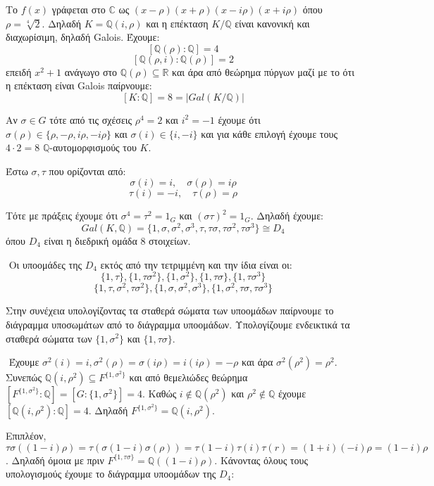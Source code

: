 \documentclass[oneside,a4paper]{article}
\newcommand {\tl}{\textlatin}
\newcommand{\Q}{\mathbb{Q}}
\begin{document}
Το $f(x)$ γράφεται στο $\mathbb C$ ως $(x-\rho )(x+\rho )(x-i\rho )(x+i\rho )$ όπου $\rho = \sqrt[4]2$. Δηλαδή $K = \Q (i,\rho )$ και η επέκταση $K/\Q$ είναι κανονική και διαχωρίσιμη, δηλαδή \tl{Galois}. Έχουμε:
$$[\Q (\rho ): \Q] = 4$$
$$[\Q (\rho, i) : \Q(\rho )]=2 $$
επειδή $x^2 +1$ ανάγωγο στο $\Q (\rho) \subseteq \mathbb R$ και άρα από θεώρημα πύργων μαζί με το ότι η επέκταση είναι \tl{Galois} παίρνουμε:
$$[K:\Q ]  = 8 = |Gal(K/\Q )|$$

Αν $\sigma \in G$ τότε από τις σχέσεις $\rho^4 = 2$ και $i^2 = -1$ έχουμε ότι $\sigma (\rho) \in \{ \rho, -\rho , i\rho , -i\rho \}$ και $\sigma (i) \in \{i,-i\}$ και για κάθε επιλογή έχουμε τους $4\cdot 2 = 8$ $\Q$-αυτομορφισμούς του $K$.

Έστω $\sigma , \tau$ που ορίζονται από:
$$\sigma (i) = i, \quad \sigma (\rho ) = i\rho $$
$$\tau (i) = -i, \quad \tau(\rho ) = \rho $$

Τότε με πράξεις έχουμε ότι $\sigma ^4 = \tau^2 = 1_G$ και $(\sigma \tau )^2 = 1_G$. Δηλαδή έχουμε: 
$$ Gal(K, \Q) = \{1, \sigma , \sigma^2 , \sigma ^3 , \tau , \tau\sigma , \tau\sigma^2 , \tau\sigma^3 \} \cong D_4$$
όπου $D_4$ είναι η διεδρική ομάδα 8 στοιχείων. 

$ $\newline
Οι υποομάδες της $D_4$ εκτός από την τετριμμένη και την ίδια είναι οι:
$$\{1,\tau \}, \{1,\tau\sigma^2 \} , \{1,\sigma^2 \} , \{1,\tau\sigma \} , \{1,\tau\sigma^3\}$$
$$\{1,\tau,\sigma^2,\tau\sigma^2\},\{1,\sigma,\sigma^2,\sigma^3\},\{1,\sigma^2 , \tau\sigma , \tau\sigma^3\}$$

Στην συνέχεια υπολογίζοντας τα σταθερά σώματα των υποομάδων παίρνουμε το διάγραμμα υποσωμάτων από το διάγραμμα υποομάδων.
Υπολογίζουμε ενδεικτικά τα σταθερά σώματα των $\{1,\sigma^2\}$ και $\{1,\tau\sigma \}$.

$ $\newline
Έχουμε $\sigma^2 (i) = i, \sigma^2 (\rho) = \sigma(i\rho) = i(i\rho) = -\rho$ και άρα $\sigma^2 (\rho^2) = \rho^2$. Συνεπώς $\Q (i, \rho^2) \subseteq F^{\{1,\sigma^2\}}$ και από θεμελιώδες θεώρημα $[F^{\{1,\sigma^2\}} : \Q ] = [G:\{1,\sigma^2\}] = 4$. Καθώς $i \not\in \Q (\rho^2 )$ και $\rho^2 \not\in \Q$ έχουμε $[\Q (i, \rho^2) : \Q] = 4$. Δηλαδή $F^{\{1,\sigma^2\}} = \Q (i, \rho^2)$.

$ $\newline Επιπλέον, $\tau\sigma ((1-i)\rho) = \tau ( \sigma (1-i) \sigma(\rho)) = \tau (1-i) \tau (i) \tau (r) = (1+i)(-i)\rho = (1-i)\rho$. Δηλαδή όμοια με πριν $F^{\{1,\tau\sigma \}} = \Q ((1-i)\rho)$.
Κάνοντας όλους τους υπολογισμούς έχουμε το διάγραμμα υποομάδων της $D_4$:
\end{document}
